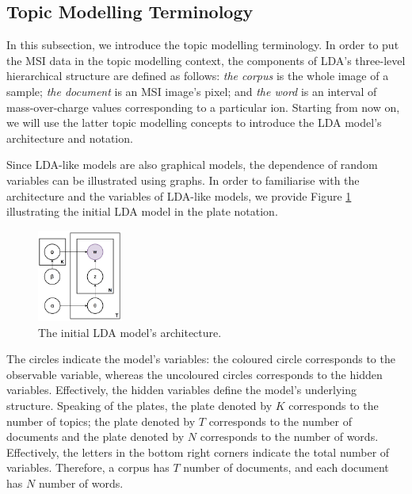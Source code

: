 \documentclass{mpaper}
\begin{document}
\subsection{Topic Modelling Terminology}

\par In this subsection, we introduce the topic modelling terminology. In order to put the MSI data in the topic modelling context, the components of  LDA's three-level hierarchical structure are defined as follows: \textit{the corpus} is the whole image of a sample; \textit{the document} is an MSI image's pixel; and \textit{the word} is an interval of mass-over-charge values corresponding to a particular ion. Starting from now on, we will use the latter topic modelling concepts to introduce the LDA model's architecture and notation.

\par Since LDA-like models are also graphical models, the dependence of random variables can be illustrated using graphs. In order to familiarise with the architecture and the variables of LDA-like models, we provide Figure \ref{fig:arch_LDA-init} illustrating the initial LDA model in the plate notation.
\begin{figure}[h]
  \centering
  \includegraphics[width=0.25\textwidth]{LDA-initial.png}
  \caption{The initial LDA model's architecture.}
  \label{fig:arch_LDA-init}
\end{figure}
The circles indicate the model's variables: the coloured circle corresponds to the observable variable, whereas the uncoloured circles corresponds to the hidden variables. Effectively, the hidden variables define the model's underlying structure. Speaking of the plates, the plate denoted by $K$ corresponds to the number of topics; the plate denoted by $T$ corresponds to the number of documents and the plate denoted by $N$ corresponds to the number of words. Effectively, the letters in the bottom right corners indicate the total number of variables. Therefore, a corpus has $T$ number of documents, and each document has $N$ number of words.
\end{document}
